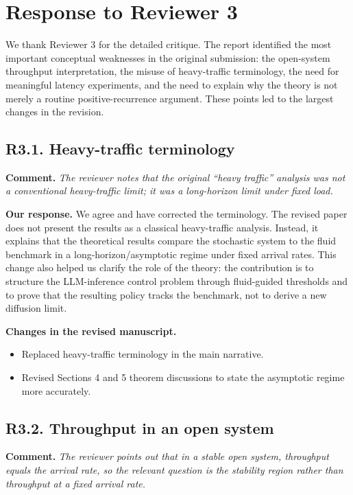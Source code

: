 \documentclass[11pt]{article}
\newcommand{\comment}[1]{%
  \vspace{0.25em}
  \noindent\textbf{Comment.} \emph{#1}
}
\newcommand{\response}{\vspace{0.25em}\noindent\textbf{Our response.} }
\newcommand{\changes}{\vspace{0.25em}\noindent\textbf{Changes in the revised manuscript.} }
\begin{document}
\section*{Response to Reviewer 3}

We thank Reviewer 3 for the detailed critique. The report identified the most important conceptual weaknesses in the original submission: the open-system throughput interpretation, the misuse of heavy-traffic terminology, the need for meaningful latency experiments, and the need to explain why the theory is not merely a routine positive-recurrence argument. These points led to the largest changes in the revision.

\subsection*{R3.1. Heavy-traffic terminology}

\comment{The reviewer notes that the original ``heavy traffic'' analysis was not a conventional heavy-traffic limit; it was a long-horizon limit under fixed load.}

\response We agree and have corrected the terminology. The revised paper does not present the results as a classical heavy-traffic analysis. Instead, it explains that the theoretical results compare the stochastic system to the fluid benchmark in a long-horizon/asymptotic regime under fixed arrival rates. This change also helped us clarify the role of the theory: the contribution is to structure the LLM-inference control problem through fluid-guided thresholds and to prove that the resulting policy tracks the benchmark, not to derive a new diffusion limit.

\changes
\begin{itemize}
    \item Replaced heavy-traffic terminology in the main narrative.
    \item Revised Sections 4 and 5 theorem discussions to state the asymptotic regime more accurately.
\end{itemize}

\subsection*{R3.2. Throughput in an open system}

\comment{The reviewer points out that in a stable open system, throughput equals the arrival rate, so the relevant question is the stability region rather than throughput at a fixed arrival rate.}
\end{document}

